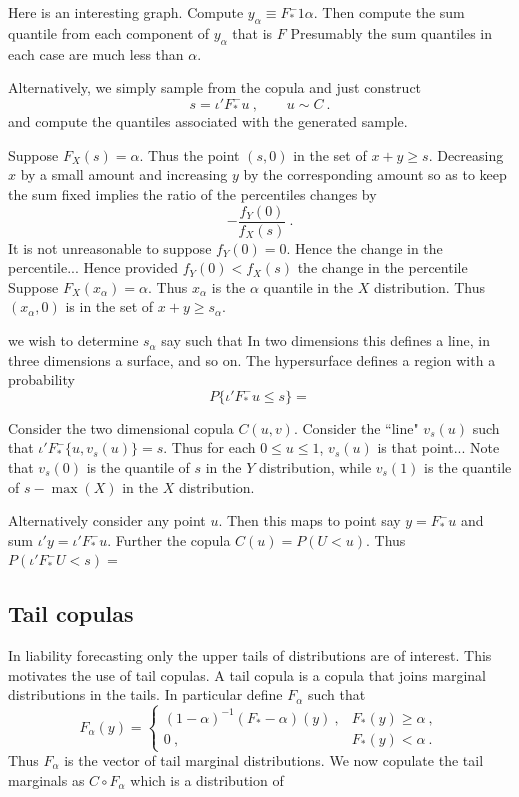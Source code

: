\documentclass[a4paper,12pt]{article}
\begin{document}
Here is an interesting graph.   Compute $y_\alpha\equiv F_*^-1\alpha$.  Then compute the sum quantile from each component of $y_\alpha$ that is $F$  Presumably the sum quantiles in each case are much less than $\alpha$.

Alternatively, we simply sample from the copula and just construct
$$
s=\iota'F_*^-u\ ,\qquad  u\sim C\ .
$$
and compute the quantiles associated with the generated sample.

Suppose $F_X(s)=\alpha$.  Thus the point $(s,0)$ in the set of $x+y\ge s$.  Decreasing $x$ by a small amount and increasing $y$ by the corresponding amount so as to keep the sum fixed implies the ratio of the percentiles changes by
$$
-\frac{f_Y(0)}{f_X(s)}\ .
$$
It is not unreasonable to suppose $f_Y(0)=0$.  Hence the change in the percentile...
Hence provided $f_Y(0)<f_X(s)$ the change in the percentile
Suppose $F_X(x_\alpha)=\alpha$.  Thus $x_\alpha$ is the $\alpha$ quantile in the $X$ distribution.   Thus $(x_\alpha,0)$ is in the set of $x+y\ge s_\alpha$.


we wish to determine $s_\alpha$ say such that
In two dimensions this defines a line, in three dimensions a surface, and so on.  The hypersurface defines a region with a probability
$$
P\{\iota'F_*^-u\le s\}=
$$

Consider the two dimensional copula $C(u,v)$.   Consider the ``line" $v_s(u)$ such that $\iota'F_*^-\{u,v_s(u)\}=s$.  Thus for each $0\le u\le 1$, $v_s(u)$ is that point...   Note that $v_s(0)$ is the quantile  of $s$ in the $Y$ distribution, while $v_s(1)$ is the quantile of $s-\max(X)$ in the $X$ distribution.

Alternatively consider any point $u$.   Then this maps to point say $y=F_*^-u$ and sum $\iota'y=\iota' F_*^-u$.  Further
the copula $C(u)=P(U<u)$.  Thus $P(\iota'F_*^-U<s)=$

\subsection*{Tail copulas}

In liability forecasting only the  upper tails of distributions are of interest.   This motivates the use of tail copulas.   A tail copula is a copula that joins marginal distributions in the tails.   In particular define $F_\alpha$ such that
$$
F_\alpha(y)=\left\{\begin{array}{lr}(1-\alpha)^{-1}(F_*-\alpha)(y)\ , & F_*(y)\ge \alpha\ ,\\ 0\ , &F_*(y)<\alpha\ .\end{array}\right.
$$
Thus $F_\alpha$ is the vector of tail marginal distributions. We now copulate the tail marginals as $C\circ F_\alpha$ which is a distribution of
\end{document}
